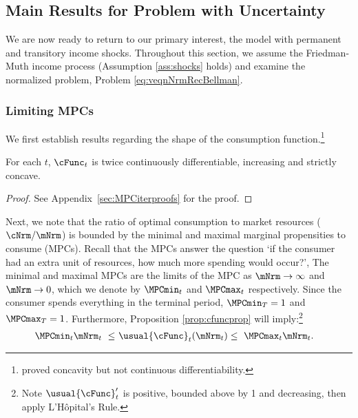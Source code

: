 \documentclass[BufferStockTheory]{subfiles}
\begin{document}
\hypertarget{limsolexists}{}
\subsection{Main Results for Problem with Uncertainty}\label{subsec:limSolExists}

We are now ready to return to our primary interest, the model with permanent and transitory income shocks.
Throughout this section, we assume the Friedman-Muth income process (Assumption \ref{ass:shocks} holds) and examine the normalized problem, Problem \ref{eq:veqnNrmRecBellman}. 


\subsubsection{Limiting MPCs}\label{subsubsec:cFuncBounds}

We first establish results regarding the shape of the consumption function.\footnote{\cite{ckConcavity} proved concavity but not continuous differentiability.}

\begin{proposition} \label{prop:cfuncprop} For each $t$, $\cFunc_{t}$ is twice continuously differentiable, increasing and strictly concave.
\end{proposition}
\begin{proof}\let\qed\relax
See Appendix~\ref{sec:MPCiterproofs} for the proof. 
\end{proof}

Next, we note that the ratio of optimal consumption to market resources ($\cNrm/\mNrm$) is bounded by the minimal and maximal marginal propensities to consume (MPCs).
Recall that the MPCs answer the question `if the consumer had an extra unit of resources, how much more spending would occur?', The minimal and maximal MPCs are the limits of the MPC as $\mNrm \rightarrow \infty$ and $\mNrm \rightarrow 0$, which we denote by $\MPCmin_{t}$ and $\MPCmax_{t}$ respectively.
Since the consumer spends everything in the terminal period, $\MPCmin_{T}=1$ and $\MPCmax_{T}=1$.
Furthermore, Proposition \ref{prop:cfuncprop} will imply:\footnote{Note $\usual{\cFunc}_{t}^{\prime}$ is positive, bounded above by 1 and decreasing, then apply L'H\^{o}pital's Rule.}
%
\begin{align}\label{eq:cBounds}
  \MPCmin_{t} \mNrm_{t} ~ \leq & ~  \usual{\cFunc}_{t}(\mNrm_{t})  \leq  ~ \MPCmax_{t} \mNrm_{t} .
\end{align} 
\end{document}
